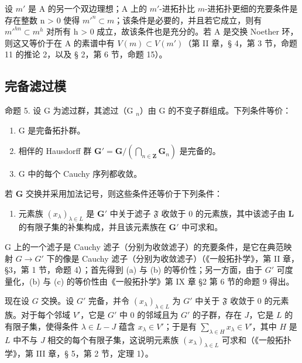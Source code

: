 	设 \(m'\) 是 A 的另一个双边理想；A 上的 \(m'\)-进拓扑比 \(m\)-进拓扑更细的充要条件是存在整数 n \textgreater{} 0 使得 \(m'^n \subset m\)；该条件是必要的，并且若它成立，则有 \(m'^{hn} \subset m^h\) 对所有 h \textgreater{} 0 成立，故该条件也是充分的。若 A 是交换 Noether 环，则这又等价于在 A 的素谱中有 \(V(m) \subset V(m')\)（第 II 章，§ 4，第 3 节，命题 11 的推论 2，以及 § 2，第 6 节，命题 15）。

\subsection{完备滤过模}

命题 5. 设 G 为滤过群，其滤过（G \(_{n}\)）由 G 的不变子群组成。下列条件等价：

\begin{enumerate}
\def\labelenumi{(\alph{enumi})}
\item
  G 是完备拓扑群。
\item
  相伴的 Hausdorff 群 \(\mathbf{G}' = \mathbf{G} / \left(\bigcap_{n\in \mathbf{Z}}\mathbf{G}_n\right)\) 是完备的。
\item
  G 中的每个 Cauchy 序列都收敛。
\end{enumerate}

若 \(\mathbf{G}\) 交换并采用加法记号，则这些条件还等价于下列条件：

\begin{enumerate}
\def\labelenumi{(\alph{enumi})}
\setcounter{enumi}{3}
\tightlist
\item
	元素族 \((x_{\lambda})_{\lambda \in L}\) 是 \(\mathbf{G}'\) 中关于滤子 \(\mathfrak{F}\) 收敛于 0 的元素族，其中该滤子由 \(\mathbf{L}\) 的有限子集的补集构成，并且该元素族在 \(\mathbf{G}'\) 中可求和。
\end{enumerate}

G 上的一个滤子是 Cauchy 滤子（分别为收敛滤子）的充要条件，是它在典范映射 \(G \rightarrow G'\) 下的像是 Cauchy 滤子（分别为收敛滤子）（《一般拓扑学》，第 II 章，§3，第 1 节，命题 4）；首先得到 (a) 与 (b) 的等价性；另一方面，由于 \(G'\) 可度量化，(b) 与 (c) 的等价性由《一般拓扑学》第 IX 章 §2 第 6 节的命题 9 得出。

	现在设 \(G\) 交换。设 \(G'\) 完备，并令 \((x_{\lambda})_{\lambda \in L}\) 为 \(G'\) 中关于 \(\mathfrak{F}\) 收敛于 0 的元素族。对于每个邻域 \(V'\)，它是 \(G'\) 中 0 的邻域且为 \(G'\) 的子群，存在 \(J\)，它是 \(L\) 的有限子集，使得条件 \(\lambda \in L - J\) 蕴含 \(x_{\lambda} \in V'\)；于是有 \(\sum_{\lambda \in H} x_{\lambda} \in V'\)，其中 \(H\) 是 \(L\) 中不与 \(J\) 相交的每个有限子集，这说明元素族 \((x_{\lambda})_{\lambda \in L}\) 可求和（《一般拓扑学》，第 III 章，§ 5，第 2 节，定理 1）。

